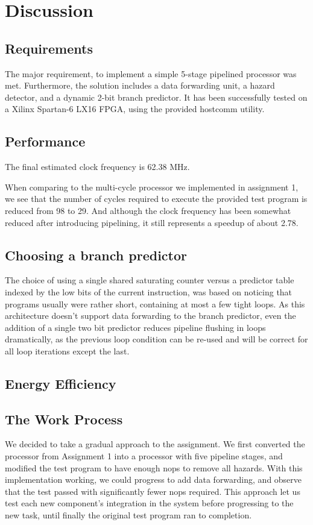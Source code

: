 \chapter{Discussion}

\section{Requirements}
The major requirement, to implement a simple 5-stage pipelined processor was met.
Furthermore, the solution includes a data forwarding unit, a hazard detector, and a dynamic 2-bit branch predictor.
It has been successfully tested on a Xilinx Spartan-6 LX16 FPGA, using the provided hostcomm\cite{hostcomm} utility.

\section{Performance}

The final estimated clock frequency is 62.38 MHz.

When comparing to the multi-cycle processor we implemented in assignment 1, we see that the number of cycles required to execute the provided test program is reduced from 98 to 29.
And although the clock frequency has been somewhat reduced after introducing pipelining, it still represents a speedup of about 2.78.


\section{Choosing a branch predictor}
The choice of using a single shared saturating counter versus a predictor table indexed by the low bits of the current instruction, was based on noticing that programs usually were rather short, containing at most a few tight loops.
As this architecture doesn't support data forwarding to the branch predictor, even the addition of a single two bit predictor reduces pipeline flushing in loops dramatically, as the previous loop condition can be re-used and will be correct for all loop iterations except the last.

\section{Energy Efficiency}

\section{The Work Process}
We decided to take a gradual approach to the assignment.
We first converted the processor from Assignment 1 into a processor with five pipeline stages, and modified the test program to have enough nops to remove all hazards.
With this implementation working, we could progress to add data forwarding, and observe that the test passed with significantly fewer nops required.
This approach let us test each new component's integration in the system before progressing to the new task, until finally the original test program ran to completion.

